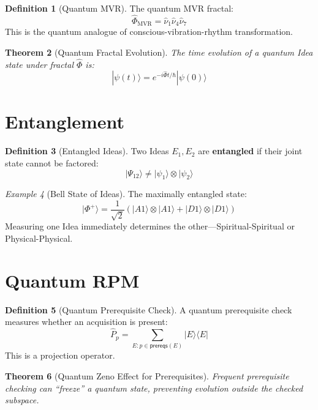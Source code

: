 \documentclass[11pt,twoside,openright]{book}
\theoremstyle{definition}
\newtheorem{definition}{Definition}[chapter]
\theoremstyle{plain}
\newtheorem{theorem}[definition]{Theorem}
\theoremstyle{remark}
\newtheorem{example}[definition]{Example}
\newcommand{\Frac}{\Phi}
\newcommand{\qket}[1]{|#1\rangle}
\newcommand{\qbra}[1]{\langle#1|}
\newcommand{\qop}[1]{\hat{#1}}
\begin{document}
\begin{definition}[Quantum MVR]
\label{def:quantum-mvr}
The quantum MVR fractal:
\[
\qop{\Frac}_{\text{MVR}} = \qop{\nu}_1 \qop{\nu}_4 \qop{\nu}_7
\]
This is the quantum analogue of conscious-vibration-rhythm transformation.
\end{definition}

\begin{theorem}[Quantum Fractal Evolution]
\label{thm:quantum-evolution}
The time evolution of a quantum Idea state under fractal $\qop{\Frac}$ is:
\[
\qket{\psi(t)} = e^{-i \qop{\Frac} t / \hbar} \qket{\psi(0)}
\]
\end{theorem}

\section{Entanglement}

\begin{definition}[Entangled Ideas]
\label{def:entanglement}
Two Ideas $E_1, E_2$ are \textbf{entangled} if their joint state cannot be factored:
\[
\qket{\Psi_{12}} \neq \qket{\psi_1} \otimes \qket{\psi_2}
\]
\end{definition}

\begin{example}[Bell State of Ideas]
\label{ex:bell-state}
The maximally entangled state:
\[
\qket{\Phi^+} = \frac{1}{\sqrt{2}}(\qket{A1} \otimes \qket{A1} + \qket{D1} \otimes \qket{D1})
\]
Measuring one Idea immediately determines the other---Spiritual-Spiritual or Physical-Physical.
\end{example}

\section{Quantum RPM}

\begin{definition}[Quantum Prerequisite Check]
\label{def:quantum-check}
A quantum prerequisite check measures whether an acquisition is present:
\[
\qop{P}_p = \sum_{E : p \in \mathsf{prereqs}(E)} \qket{E}\qbra{E}
\]
This is a projection operator.
\end{definition}

\begin{theorem}[Quantum Zeno Effect for Prerequisites]
\label{thm:quantum-zeno}
Frequent prerequisite checking can ``freeze'' a quantum state, preventing evolution outside the checked subspace.
\end{theorem}
\end{document}
